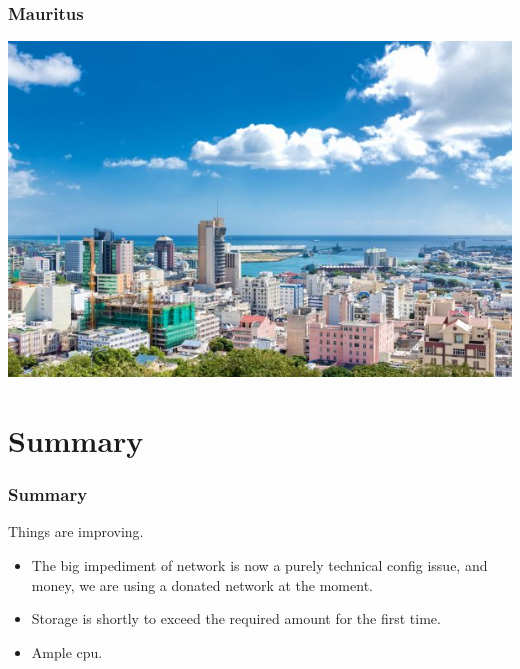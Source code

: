 \documentclass{beamer}
\begin{document}
\begin{frame}
    \frametitle{Mauritus}
    \includegraphics[scale=0.5]{MauritiusCBD.jpg}
\end{frame}
\section{Summary}

\begin{frame}
    \frametitle{Summary}
    Things are improving.
    \begin{itemize}
        \item The big impediment of network is now a purely technical config issue, and money, we are using a donated network at the moment.
        \item Storage is shortly to exceed the required amount for the first time.
        \item Ample cpu.
    \end{itemize}
\end{frame}
\end{document}
